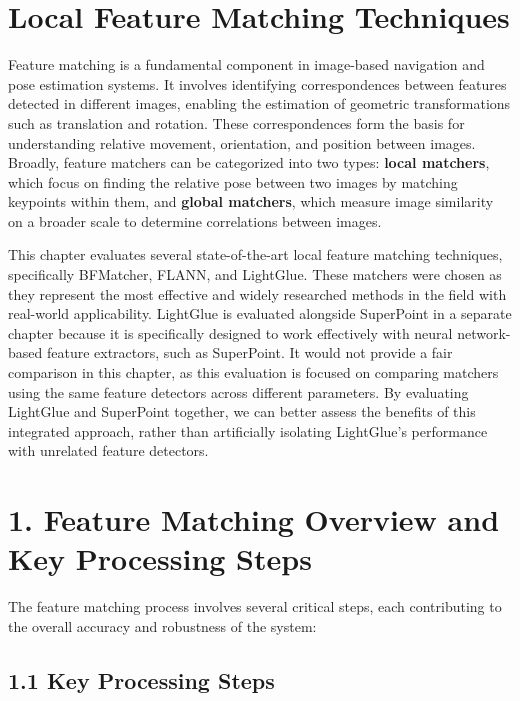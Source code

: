 



\section*{Local Feature Matching Techniques}

Feature matching is a fundamental component in image-based navigation and pose estimation systems. It involves identifying correspondences between features detected in different images, enabling the estimation of geometric transformations such as translation and rotation. These correspondences form the basis for understanding relative movement, orientation, and position between images. Broadly, feature matchers can be categorized into two types: \textbf{local matchers}, which focus on finding the relative pose between two images by matching keypoints within them, and \textbf{global matchers}, which measure image similarity on a broader scale to determine correlations between images.

This chapter evaluates several state-of-the-art local feature matching techniques, specifically BFMatcher, FLANN, and LightGlue. These matchers were chosen as they represent the most effective and widely researched methods in the field with real-world applicability. LightGlue is evaluated alongside SuperPoint in a separate chapter because it is specifically designed to work effectively with neural network-based feature extractors, such as SuperPoint. It would not provide a fair comparison in this chapter, as this evaluation is focused on comparing matchers using the same feature detectors across different parameters. By evaluating LightGlue and SuperPoint together, we can better assess the benefits of this integrated approach, rather than artificially isolating LightGlue's performance with unrelated feature detectors.

\section*{1. Feature Matching Overview and Key Processing Steps}

The feature matching process involves several critical steps, each contributing to the overall accuracy and robustness of the system:

\subsection*{1.1 Key Processing Steps}

